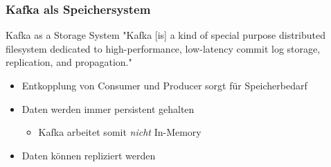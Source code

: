 %

\begin{frame}
\frametitle{Kafka als Speichersystem}

\begin{block}{Kafka as a Storage System}
	"Kafka [is] a kind of special purpose distributed filesystem dedicated to high-performance, low-latency commit log storage, replication, and propagation." \cite{Kafka}
\end{block}


\begin{itemize}
	\item Entkopplung von Consumer und Producer sorgt für Speicherbedarf
	\item Daten werden immer persistent gehalten
	\begin{itemize}
		\item Kafka arbeitet somit \textit{nicht} In-Memory
	\end{itemize}
	\item Daten können repliziert werden
\end{itemize}

\end{frame}



